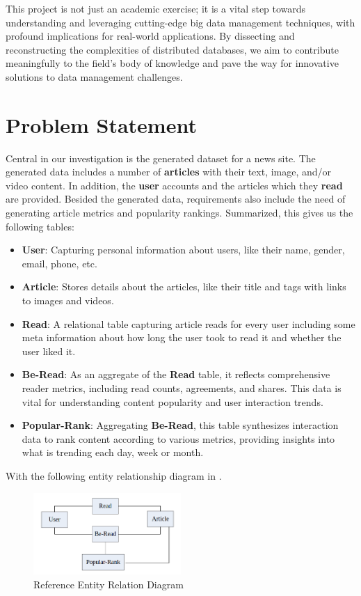 \documentclass{report}
\begin{document}
    This project is not just an academic exercise; it is a vital step towards understanding and leveraging cutting-edge big data management techniques, with profound implications for real-world applications. By dissecting and reconstructing the complexities of distributed databases, we aim to contribute meaningfully to the field's body of knowledge and pave the way for innovative solutions to data management challenges.


    \section{Problem Statement}
    Central in our investigation is the generated dataset for a news site. The generated data includes a number of \textbf{articles} with their text, image, and/or video content. In addition, the \textbf{user} accounts and the articles which they \textbf{read} are provided. Besided the generated data, requirements also include the need of generating article metrics and popularity rankings. Summarized, this gives us the following tables:

    \begin{itemize}
        \item \textbf{User}: Capturing personal information about users, like their name, gender, email, phone, etc.
        \item \textbf{Article}: Stores details about the articles, like their title and tags with links to images and videos.
        \item \textbf{Read}: A relational table capturing article reads for every user including some meta information about how long the user took to read it and whether the user liked it.
        \item \textbf{Be-Read}: As an aggregate of the \textbf{Read} table, it reflects comprehensive reader metrics, including read counts, agreements, and shares. This data is vital for understanding content popularity and user interaction trends.
        \item \textbf{Popular-Rank}: Aggregating \textbf{Be-Read}, this table synthesizes interaction data to rank content according to various metrics, providing insights into what is trending each day, week or month.
    \end{itemize}

    With the following entity relationship diagram in .

    \begin{figure}[H]
        \centering
        \includegraphics[width=0.5\textwidth]{images/reference-entity-relation-diagram}
        \caption{Reference Entity Relation Diagram}
        \label{fig:reference-entity-relation-diagram}
    \end{figure}
\end{document}
